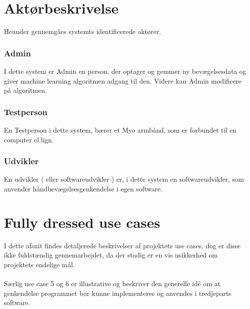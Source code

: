 \section{Aktørbeskrivelse}
Heunder gennemgåes systemts identificerede aktører.
\subsubsection*{Admin}
I dette system er Admin en person, der optager og gemmer ny bevægelsesdata og giver machine learning algoritmen adgang til den. Videre kan Admin modificere på algoritmen.

\subsubsection*{Testperson}
En Testperson i dette system, bærer et Myo armbånd, som er forbundet til en computer el.lign.   

\subsubsection*{Udvikler}
En udvikler ( eller softwareudvikler ) er, i dette system en softwareudvikler, som anvender håndbevægelsesgenkendelse i egen software.  

\section{Fully dressed use cases}
I dette afsnit findes detaljerede beskrivelser af projektets use cases, dog er disse ikke fuldstændig gennemarbejdet, da der stadig er en vis usikkerhed om projektets endelige mål.
\\ \\Særlig use case 5 og 6 er illustrative og beskriver den generelle idé om at genkendelse programmet bør kunne implementeres og anvendes i tredjeparts software.
